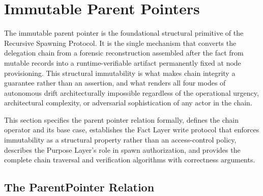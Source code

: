 \section{Immutable Parent Pointers}
\label{sec:immutable-parent-pointers}

The immutable parent pointer is the foundational structural primitive of the Recursive Spawning Protocol. It is the single mechanism that converts the delegation chain from a forensic reconstruction assembled after the fact from mutable records into a runtime-verifiable artifact permanently fixed at node provisioning. This structural immutability is what makes chain integrity a guarantee rather than an assertion, and what renders all four modes of autonomous drift architecturally impossible regardless of the operational urgency, architectural complexity, or adversarial sophistication of any actor in the chain.

This section specifies the parent pointer relation formally, defines the chain operator and its base case, establishes the Fact Layer write protocol that enforces immutability as a structural property rather than an access-control policy, describes the Purpose Layer's role in spawn authorization, and provides the complete chain traversal and verification algorithms with correctness arguments.

\subsection{The ParentPointer Relation}
\label{sec:parent-pointer-definition}

